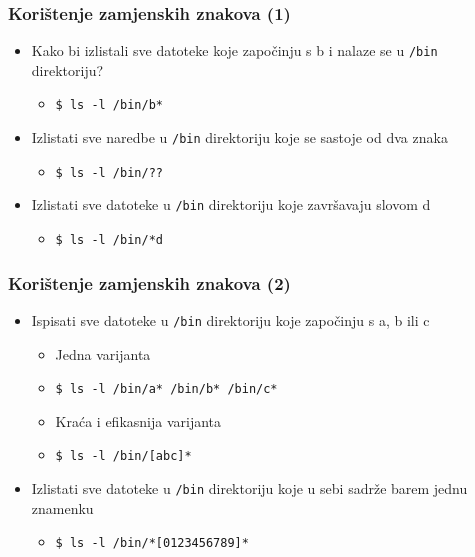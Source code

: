 \documentclass[table,usenames,dvipsnames]{beamer}
\newcommand{\shell}[1]{\texttt{#1}}
\begin{document}
\begin{frame}[t]
\frametitle{Korištenje zamjenskih znakova (1)}
\begin{itemize}
  \item Kako bi izlistali sve datoteke koje započinju s b i nalaze se u 
        \shell{/bin} direktoriju?
  \begin{itemize}
    \item[] \shell{\$ ls -l /bin/b*}
  \end{itemize}
  \item Izlistati sve naredbe u \shell{/bin} direktoriju koje se sastoje od
        dva znaka
  \begin{itemize}
    \item[] \shell{\$ ls -l /bin/??}
  \end{itemize}
  \item Izlistati sve datoteke u \shell{/bin} direktoriju koje završavaju 
        slovom d
  \begin{itemize}
    \item[] \shell{\$ ls -l /bin/*d}
  \end{itemize}
\end{itemize}
\end{frame}

\begin{frame}[t]
\frametitle{Korištenje zamjenskih znakova (2)}
\begin{itemize}
  \item Ispisati sve datoteke u \shell{/bin} direktoriju koje započinju s
        a, b ili c
  \begin{itemize}
    \item Jedna varijanta
    \item[] \shell{\$ ls -l /bin/a* /bin/b* /bin/c*}
    \item Kraća i efikasnija varijanta
    \item[] \shell{\$ ls -l /bin/[abc]*}
  \end{itemize}
  \item Izlistati sve datoteke u \shell{/bin} direktoriju koje u sebi 
        sadrže barem jednu znamenku
  \begin{itemize}
    \item[] \shell{\$ ls -l /bin/*[0123456789]*}
  \end{itemize}
\end{itemize}
\end{frame}
\end{document}
